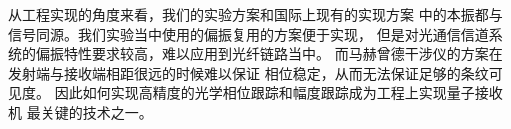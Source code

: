 从工程实现的角度来看，我们的实验方案和国际上现有的实现方案
中的本振都与信号同源\cite{wittmann2008demonstration,wittmann2010demonstration,tsujino2010sub,
tsujino2011quantum,becerra2011m,chen2012optical,muller2012quadrature,becerra2013experimental,
becerra2015photon}。我们实验当中使用的偏振复用的方案便于实现，
但是对光通信信道系统的偏振特性要求较高，难以应用到光纤链路当中。
而马赫曾德干涉仪的方案在发射端与接收端相距很远的时候难以保证
相位稳定，从而无法保证足够的条纹可见度。
因此如何实现高精度的光学相位跟踪和幅度跟踪成为工程上实现量子接收机
最关键的技术之一。



